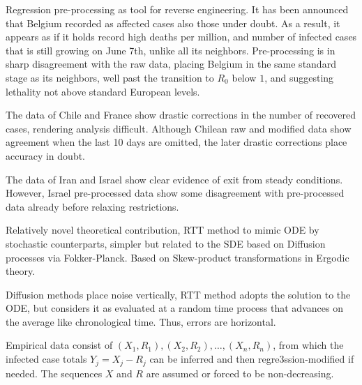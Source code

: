 \documentclass{article}
\begin{document}
\bigskip

\noindent Regression pre-processing as tool for reverse engineering. It has been announced that Belgium recorded as affected cases also those under doubt. As a result, it appears as if it holds record high deaths per million, and number of infected cases that is still growing on June 7th, unlike all its neighbors. Pre-processing is in sharp disagreement with the raw data, placing Belgium in the same standard stage as its neighbors, well past the transition to $R_0$ below $1$, and suggesting lethality not above standard European levels.

\bigskip

\noindent The data of Chile and France show drastic corrections in the number of recovered cases, rendering analysis difficult. Although Chilean raw and modified data show agreement when the last 10 days are omitted, the later drastic corrections place accuracy in doubt.

\bigskip

The data of Iran and Israel show clear evidence of exit from steady conditions. However, Israel pre-processed data show some disagreement with pre-processed data already before relaxing restrictions.

\newpage


\bigskip

\noindent Relatively novel theoretical contribution, RTT method to mimic ODE by stochastic counterparts, simpler but related to the SDE based on Diffusion processes via Fokker-Planck. Based on Skew-product transformations in Ergodic theory.

\bigskip

\noindent Diffusion methods place noise vertically, RTT method adopts the solution to the ODE, but considers it as evaluated at a random time process that advances on the average like chronological time. Thus, errors are horizontal.

\bigskip

\noindent Empirical data consist of $(X_1,R_1), (X_2,R_2), \dots, (X_n, R_n)$, from which the infected case totals \linebreak $Y_j=X_j-R_j$ can be inferred and then regre3ssion-modified if needed. The sequences $X$ and $R$ are assumed or forced to be non-decreasing.

\bigskip
\end{document}
